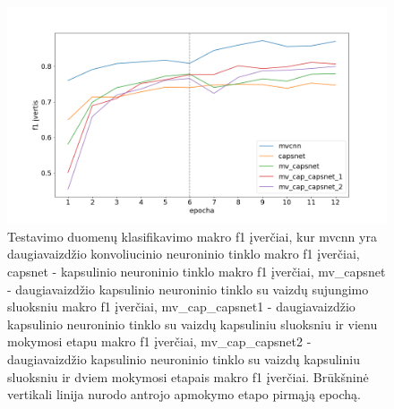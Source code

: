 \begin{figure}[H]
	\centering
	\includegraphics[scale=0.4]{img/macro.png}
	\caption{
		Testavimo duomenų klasifikavimo makro f1 įverčiai, kur mvcnn yra daugiavaizdžio konvoliucinio neuroninio tinklo makro f1 įverčiai, capsnet - kapsulinio neuroninio tinklo makro f1 įverčiai, mv\_capsnet - daugiavaizdžio kapsulinio neuroninio tinklo su vaizdų sujungimo sluoksniu makro f1 įverčiai, mv\_cap\_capsnet1 - daugiavaizdžio kapsulinio neuroninio tinklo su vaizdų kapsuliniu sluoksniu ir vienu mokymosi etapu makro f1 įverčiai, mv\_cap\_capsnet2 - daugiavaizdžio kapsulinio neuroninio tinklo su vaizdų kapsuliniu sluoksniu ir dviem mokymosi etapais makro f1 įverčiai. Brūkšninė vertikali linija nurodo antrojo apmokymo etapo pirmąją epochą.
	}
	\label{img:macro_f1}
\end{figure}

